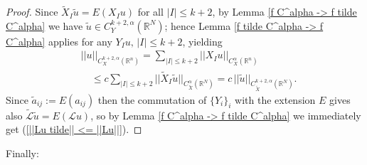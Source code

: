 \documentclass{article}
\numberwithin{equation}{section}
\begin{document}
\vspace{2mm}

\begin{proof}
    Since $\widetilde{X}_I \widetilde{u}=E(X_Iu)$ for all $|I| \leq k+2$, by Lemma \ref{f C^alpha -> f tilde C^alpha} we have $\widetilde{u} \in C^{k+2,\alpha}_Y(\mathbb{R}^N)$; hence Lemma \ref{f tilde C^alpha -> f C^alpha} applies for any $Y_I u, \, |I| \leq k+2$, yielding
    \begin{align*}
        & ||u||_{C^{k+2,\alpha}_X(\mathbb{R}^n)} = \sum_{|I| \leq k+2} ||X_I u||_{C^{\alpha}_{X}(\mathbb{R}^n)} \\
        & \quad \leq c\sum_{|I| \leq k+2} ||\widetilde{X}_I \widetilde{u}||_{C^{\alpha}_{\widetilde{X}}(\mathbb{R}^N)} = c \, ||\widetilde{u}||_{C^{k+2,\alpha}_{\widetilde{X}}(\mathbb{R}^N)}.
    \end{align*}
    Since $\widetilde{a}_{ij}:=E(a_{ij})$ then the commutation of $\{Y_i\}_i$ with the extension $E$ gives also $\mathcal{\widetilde{L}} \widetilde{u} = E(\mathcal{L} u)$, so by Lemma \ref{f C^alpha -> f tilde C^alpha} we immediately get (\ref{||Lu tilde|| <= ||Lu||}).
\end{proof}

\vspace{2mm}

\hspace{-7mm} Finally:

\vspace{2mm}
\end{document}
